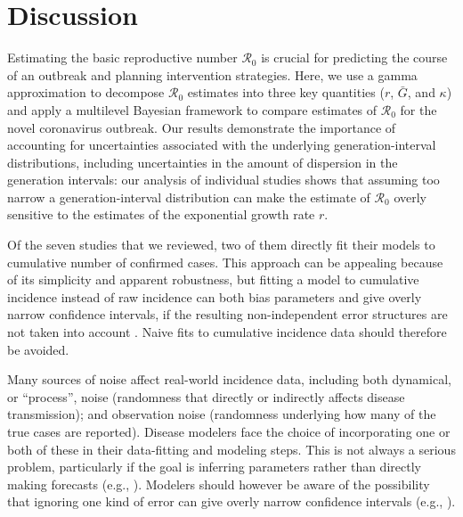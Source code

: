 \documentclass[12pt]{article}
\newcommand{\Ro}{\ensuremath{{\mathcal R}_{0}}\xspace}
\begin{document}
\section{Discussion}

Estimating the basic reproductive number \Ro is crucial for predicting the course of an outbreak and planning intervention strategies.
Here, we use a gamma approximation \citep{park2019practical} to decompose \Ro estimates into three key quantities ($r$, $\bar G$, and $\kappa$) and apply a multilevel Bayesian framework to compare estimates of \Ro for the novel coronavirus outbreak.
Our results demonstrate the importance of accounting for uncertainties associated with the underlying generation-interval distributions, including uncertainties in the amount of dispersion in the generation intervals:
our analysis of individual studies shows that assuming too narrow a generation-interval distribution can make the estimate of \Ro overly sensitive to the estimates of the exponential growth rate $r$.

Of the seven studies that we reviewed, two of them directly fit their models to cumulative number of confirmed cases.
This approach can be appealing because of its simplicity and apparent robustness, but fitting a model to cumulative incidence instead of raw incidence can both bias parameters and give overly narrow confidence intervals, if the resulting non-independent error structures are not taken into account \citep{ma2014estimating, king2015avoidable}.
Naive fits to cumulative incidence data should therefore be avoided.

Many sources of noise affect real-world incidence data, including both dynamical, or ``process'', noise (randomness that directly or indirectly affects disease transmission); and observation noise (randomness underlying how many of the true cases are reported).  
Disease modelers face the choice of incorporating one or both of these in their data-fitting and modeling steps. 
This is not always a serious problem, particularly if the goal is inferring parameters rather than directly making forecasts (e.g., \cite{ma2014estimating}).
Modelers should however be aware of the possibility that ignoring one kind of error can give overly narrow confidence intervals (e.g., \cite{king2015avoidable, taylor2016stochasticity}).
\end{document}
